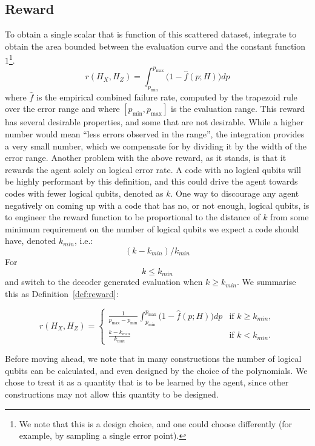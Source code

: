 \subsection{Reward}
To obtain a single scalar that is function of this scattered dataset, integrate to obtain the area bounded between the evaluation curve and the constant function \(1\)\footnote{We note that this is a design choice, and one could choose differently (for example, by sampling a single error point).}.
\begin{equation}
\label{eq:reward}
    r(H_X,H_Z)=\int_{p_{\min}}^{p_{\max}}\big(1-\widehat{f}(p;H)\big)dp
\end{equation}
where \(\widehat f\) is the empirical combined failure rate, computed by the trapezoid rule over the error range and 
where \([p_{\min}, p_{\max}]\) is the evaluation range.
This reward has several desirable properties, and some that are not desirable.
While a higher number would mean ``less errors observed in the range'', the integration provides a very small number, which we compensate for by dividing it by the width of the error range.
Another problem with the above reward, as it stands, is that it rewards the agent solely on logical error rate. 
A code with no logical qubits will be highly performant by this definition, 
and this could drive the agent towards codes with fewer logical qubits, denoted as \(k\).
One way to discourage any agent negatively on coming up with a code that has no, or not enough, logical qubits, is to engineer the reward function to 
be proportional to the distance of \(k\) from some minimum requirement on the number of logical qubits we expect a code should have, denoted \(k_{min}\), i.e.:
\[(k-k_{min})/k_{min}\]
For \[k \leq k_{min}\]
and switch to the decoder generated evaluation when \(k \geq k_{min}\). We summarise this as Definition~\ref{def:reward}:
\begin{definition}
  \begin{equation}
r(H_X,H_Z) =
       \begin{cases}
                    \frac{1}{p_{\max} - p_{\min}}\int_{p_{\min}}^{p_{\max}}\big(1-\widehat{f}(p;H)\big)dp & \text{if } k \geq k_{min},\\[1ex]
                     \frac{k-k_{min}}{k_{min}}& \text{if } k < k_{min}.
        \end{cases}
\end{equation}
\end{definition}
\noindent Before moving ahead, we note that in many constructions the number of logical qubits can be calculated, and even designed by the choice of the polynomials. 
We chose to treat it as a quantity that is to be learned by the agent, since other constructions may not allow this quantity to be designed.

